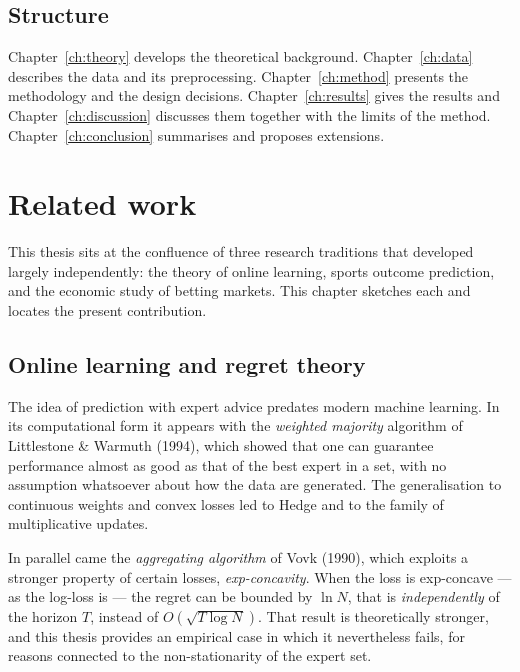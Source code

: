 \documentclass[12pt,a4paper,oneside]{report}
\renewcommand{\_}{\oldunderscore\allowbreak}
\theoremstyle{definition}
\theoremstyle{plain}
\theoremstyle{remark}
\begin{document}
\section{Structure}

Chapter~\ref{ch:theory} develops the theoretical background. Chapter~\ref{ch:data} describes
the data and its preprocessing. Chapter~\ref{ch:method} presents the methodology and the
design decisions. Chapter~\ref{ch:results} gives the results and Chapter~\ref{ch:discussion}
discusses them together with the limits of the method. Chapter~\ref{ch:conclusion} summarises
and proposes extensions.

\chapter{Related work}
\label{ch:related}

This thesis sits at the confluence of three research traditions that developed largely
independently: the theory of online learning, sports outcome prediction, and the economic
study of betting markets. This chapter sketches each and locates the present contribution.

\section{Online learning and regret theory}

The idea of prediction with expert advice predates modern machine learning. In its
computational form it appears with the \emph{weighted majority} algorithm of Littlestone \&
Warmuth (1994), which showed that one can guarantee performance almost as good as that of the
best expert in a set, with no assumption whatsoever about how the data are generated. The
generalisation to continuous weights and convex losses led to Hedge and to the family of
multiplicative updates.

In parallel came the \emph{aggregating algorithm} of Vovk (1990), which exploits a stronger
property of certain losses, \emph{exp-concavity}. When the loss is exp-concave --- as the
log-loss is --- the regret can be bounded by $\ln N$, that is \emph{independently} of the
horizon $T$, instead of $O(\sqrt{T \log N})$. That result is theoretically stronger, and this
thesis provides an empirical case in which it nevertheless fails, for reasons connected to the
non-stationarity of the expert set.
\end{document}
